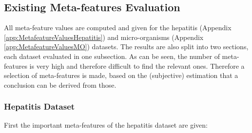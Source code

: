 \documentclass[10pt,a4paper]{report}
\begin{document}
	\subsection{Existing Meta-features Evaluation}
	\label{DEsubsec:ResultsExistingEvaluation}
	
	All meta-feature values are computed and given for the hepatitis (Appendix \ref{app:MetafeatureValuesHepatitis}) and micro-organisms (Appendix \ref{app:MetafeatureValuesMO}) datasets. The results are also split into two sections, each dataset evaluated in one subsection. As can be seen, the number of meta-features is very high and therefore difficult to find the relevant ones. Therefore a selection of meta-features is made, based on the (subjective) estimation that a conclusion can be derived from those. 
	
	\subsubsection{Hepatitis Dataset}
 	\label{DEsubsec:ExistingResultHepatitis}
	
	First the important meta-features of the hepatitis dataset are given:
	
\end{document}

